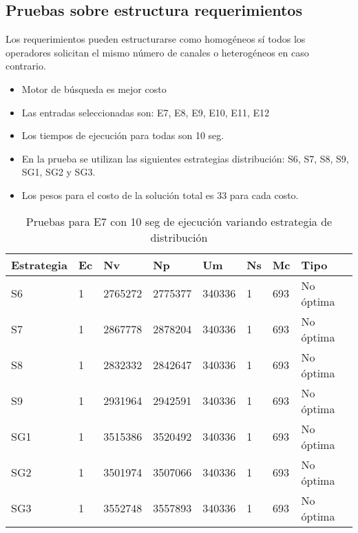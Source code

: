 \subsection{Pruebas sobre estructura requerimientos}

Los requerimientos pueden estructurarse como homogéneos sí todos los operadores solicitan el mismo número de canales o heterogéneos en caso contrario.

\begin{itemize}
	\item Motor de búsqueda es mejor costo
	\item Las entradas seleccionadas son: E7, E8, E9, E10, E11, E12	
	\item Los tiempos de ejecución para todas son 10 seg.
	\item En la prueba se utilizan las siguientes estrategias distribución: S6, S7, S8, S9, SG1, SG2 y SG3.
	\item Los pesos para el costo de la solución total es 33 para cada costo.
\end{itemize}

\begin{center}
\begin{longtable}{|p{3cm}|p{1.0cm}|p{1.6cm}|p{1.6cm}|p{1.1cm}|p{1.1cm}|p{1.1cm}|p{2.7cm}|}
	\caption{Pruebas para E7 con 10 seg de ejecución variando estrategia de distribución} \\
	\hline
	\cellcolor[gray]{0.9} \textbf{Estrategia} & \cellcolor[gray]{0.9}\textbf{Ec} & \cellcolor[gray]{0.9}\textbf{Nv} & \cellcolor[gray]{0.9}\textbf{Np} & \cellcolor[gray]{0.9}\textbf{Um} & \cellcolor[gray]{0.9}\textbf{Ns} &  \cellcolor[gray]{0.9}\textbf{Mc} & \cellcolor[gray]{0.9}\textbf{Tipo}\\	\hline
	S6& 1 &2765272  &2775377 &340336  &1 &693&No óptima \\
	\hline
	S7& 1 &2867778  &2878204 &340336  &1 &693&No óptima \\
	\hline
	S8& 1 &2832332  &2842647 &340336  &1 &693&No óptima \\
	\hline
	S9& 1 &2931964  &2942591 &340336  &1 &693&No óptima \\
	\hline
	SG1& 1 &3515386  &3520492 &340336  &1 &693&No óptima \\
	\hline
	SG2& 1 &3501974  &3507066 &340336  &1 &693&No óptima \\
	\hline
	SG3& 1 &3552748  &3557893 &340336  &1 &693&No óptima \\
	\hline
\end{longtable}	
\end{center}

